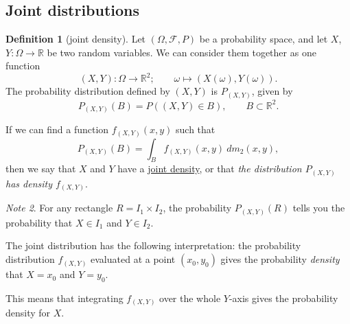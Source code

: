 \documentclass[a4paper,12pt]{scrreprt}
\newcommand{\R}{\mathbb{R}}
\newcommand{\defn}[1]{\ul{#1}}
\theoremstyle{definition}
\newtheorem{definition}{Definition}
\theoremstyle{plain}
\theoremstyle{remark}
\newtheorem{note}[definition]{Note}
\begin{document}
\subsection{Joint distributions}
\begin{definition}[joint density]
  \label{def:jointdensity}
  Let $(\Omega, \mathcal{F}, P)$ be a probability space, and let $X$, $Y\colon \Omega \to \R$ be two random variables. We can consider them together as one function
  \begin{equation*}
    (X, Y)\colon \Omega \to \R^{2};\qquad \omega \mapsto (X(\omega), Y(\omega)).
  \end{equation*}
  The probability distribution defined by $(X, Y)$ is $P_{(X, Y)}$, given by
  \begin{equation*}
    P_{(X, Y)}(B) = P\left((X, Y) \in B \right),\qquad B \subset \R^{2}.
  \end{equation*}

  If we can find a function $f_{(X, Y)}(x, y)$ such that
  \begin{equation*}
    P_{(X, Y)}(B) = \int_{B} f_{(X, Y)}(x, y)\ dm_{2}(x, y),
  \end{equation*}
  then we say that $X$ and $Y$ have a \defn{joint density}, or that \emph{the distribution $P_{(X, Y)}$ has density $f_{(X, Y)}$}.
\end{definition}

\begin{note}
  For any rectangle $R = I_{1} \times I_{2}$, the probability $P_{(X, Y)}(R)$ tells you the probability that $X \in I_{1}$ and $Y \in I_{2}$.

  The joint distribution has the following interpretation: the probability distribution $f_{(X, Y)}$ evaluated at a point $(x_{0}, y_{0})$ gives the probability \emph{density} that $X = x_{0}$ and $Y = y_{0}$.

  This means that integrating $f_{(X, Y)}$ over the whole $Y$-axis gives the probability density for $X$.
\end{note}
\end{document}
